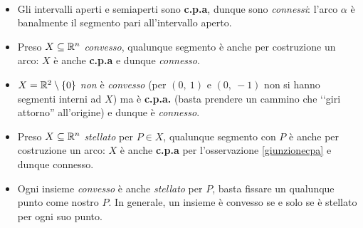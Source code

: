 \begin{examples}~{}
\begin{itemize}
	\item Gli intervalli aperti e semiaperti sono \textbf{c.p.a}, dunque sono \textit{connessi}: l'arco $\alpha$ è banalmente il segmento pari all'intervallo aperto.
	\item Preso $X\subseteq\mathbb{R}^n$ \textit{convesso}, qualunque segmento è anche per costruzione un arco: $X$ è anche \textbf{c.p.a} e dunque \textit{connesso}.
	\item $X=\mathbb{R}^{2}\setminus\left\{0\right\}$ \textit{non} è \textit{convesso} (per $\left(0,\ 1\right)$ e $\left(0,\ -1\right)$ non si hanno segmenti interni ad $X$) ma è \textbf{c.p.a.} (basta prendere un cammino che ‘‘giri attorno'' all'origine) e dunque è \textit{connesso}.
	\item Preso $X\subseteq\mathbb{R}^n$ \textit{stellato} per $P\in X$, qualunque segmento con $P$ è anche per costruzione un arco: $X$ è anche \textbf{c.p.a} per l'osservazione \ref{giunzionecpa} e dunque {connesso}.
	\item Ogni insieme \textit{convesso} è anche \textit{stellato} per $P$, basta fissare un qualunque punto come nostro $P$. In generale, un insieme è convesso se e solo se è stellato per ogni suo punto.
\end{itemize}
\vspace{-3mm}
\end{examples}
